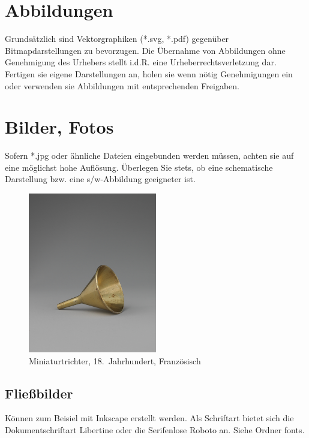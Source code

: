 \clearpage

\section{Abbildungen}
\label{sec:abbildungen}
Grundsätzlich sind Vektorgraphiken (*.svg, *.pdf) gegenüber Bitmapdarstellungen zu bevorzugen. Die Übernahme von Abbildungen ohne Genehmigung des Urhebers stellt i.d.R. eine Urheberrechtsverletzung dar. Fertigen sie eigene Darstellungen an, holen sie wenn nötig Genehmigungen ein oder verwenden sie Abbildungen mit entsprechenden Freigaben.


\section{Bilder, Fotos}
\label{sec:bilder}

Sofern *.jpg oder ähnliche Dateien eingebunden werden müssen, achten sie auf eine möglichst hohe Auflösung. Überlegen Sie stets, ob eine schematische Darstellung bzw. eine s/w-Abbildung geeigneter ist. 

\begin{figure}[h]
	\centering
	\includegraphics[width=0.5\textwidth]{bilder/01-trichter}
	\caption[Miniaturtrichter]{Miniaturtrichter, 18.~Jahrhundert, Französisch}
	\label{fig:trichter}
\end{figure}


\subsection{Fließbilder}
\label{subsec:fliessbilder}
Können zum Beisiel mit Inkscape erstellt werden. Als Schriftart bietet sich die Dokumentschriftart Libertine oder die Serifenlose Roboto an. Siehe Ordner fonts.

